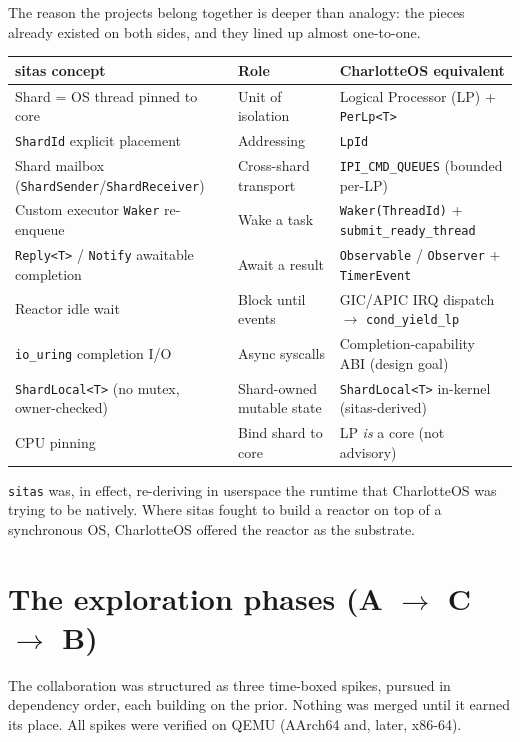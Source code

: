 The reason the projects belong together is deeper than analogy: the pieces
already existed on both sides, and they lined up almost one-to-one.

\begin{table}[h]
\centering
\begin{tabularx}{\textwidth}{l|l|l}
\textbf{sitas concept} & \textbf{Role} & \textbf{CharlotteOS equivalent} \\
\hline
Shard = OS thread pinned to core & Unit of isolation & Logical Processor (LP) + \texttt{PerLp<T>} \\
\texttt{ShardId} explicit placement & Addressing & \texttt{LpId} \\
Shard mailbox (\texttt{ShardSender}/\texttt{ShardReceiver}) & Cross-shard transport & \texttt{IPI\_CMD\_QUEUES} (bounded per-LP) \\
Custom executor \texttt{Waker} re-enqueue & Wake a task & \texttt{Waker(ThreadId)} + \texttt{submit\_ready\_thread} \\
\texttt{Reply<T>} / \texttt{Notify} awaitable completion & Await a result & \texttt{Observable} / \texttt{Observer} + \texttt{TimerEvent} \\
Reactor idle wait & Block until events & GIC/APIC IRQ dispatch $\rightarrow$ \texttt{cond\_yield\_lp} \\
\texttt{io\_uring} completion I/O & Async syscalls & Completion-capability ABI (design goal) \\
\texttt{ShardLocal<T>} (no mutex, owner-checked) & Shard-owned mutable state & \texttt{ShardLocal<T>} in-kernel (sitas-derived) \\
CPU pinning & Bind shard to core & LP \emph{is} a core (not advisory) \\
\end{tabularx}
\end{table}

\texttt{sitas} was, in effect, re-deriving in userspace the runtime that
CharlotteOS was trying to be natively. Where sitas fought to build a reactor on
top of a synchronous OS, CharlotteOS offered the reactor as the substrate.

\section{The exploration phases (A $\rightarrow$ C $\rightarrow$ B)}

The collaboration was structured as three time-boxed spikes, pursued in
dependency order, each building on the prior. Nothing was merged until it
earned its place. All spikes were verified on QEMU (AArch64 and, later, x86-64).

